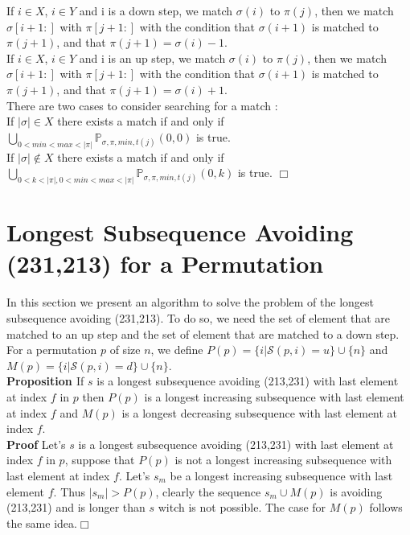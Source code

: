 \documentclass[a4paper]{llncs}
\newcommand{\ptext}{\pi}
\newcommand{\pmotif}{\sigma}
\newcommand{\x}{X}
\newcommand{\y}{Y}
\newcounter{num}
\newcommand{\numl}[1]{\refstepcounter{num}\label{#1}}
\newcommand{\dstep}{d}
\newcommand{\ustep}{u}
\begin{document}
			If $i \in \x$, $i \in \y$ and i is a down step,
			we match $\pmotif(i)$ to $\ptext(j)$, 
			then we match $\pmotif[i+1:]$ with $\ptext[j+1:]$
			with the condition that
			$\pmotif(i+1)$ is matched to $\ptext(j+1)$,
			and that $\ptext(j+1)=\pmotif(i)-1$.\\			

			If $i \in \x$, $i \in \y$ and i is an up step,
			we match $\pmotif(i)$ to $\ptext(j)$, 
			then we match $\pmotif[i+1:]$ with $\ptext[j+1:]$
			with the condition that
			$\pmotif(i+1)$ is matched to $\ptext(j+1)$,
			and that $\ptext(j+1)=\pmotif(i)+1$.\\		
					
			There are two cases to consider searching for a match : \\
			If $|\pmotif| \in \x$ there exists a match
			if and only if\\ $\bigcup_{0<min<max<|\ptext|}\mathbb{P}_{\pmotif,\ptext,min,t(j)}(0,0)$ is true.\\
			
			If $|\pmotif| \notin \x$ there exists a match if and only if \\	$\bigcup_{0<k<|\ptext|,0<min<max<|\ptext|}\mathbb{P}_{\pmotif,\ptext,min,t(j)}(0,k)$
			is true. $\Box$  			
	
	\section{Longest Subsequence Avoiding \\(231,213) for a Permutation}

	In this section we present an algorithm to solve the problem
	of the longest subsequence avoiding (231,213).
	To do so, we need the set of element
	that are matched to an up step and the
	set of element that are matched to a down step.
	For a permutation $p$ of size $n$, we define
	$P(p) = \{i | \mathcal{S}(p,i) = \ustep \} \cup \{n\}$ and  
	$M(p) = \{i | \mathcal{S}(p,i) = \dstep \} \cup \{n\}$.\\
	
	\textbf{Proposition  \numl{longestIncreasingSubsequence} \thenum}
	If $s$ is a longest subsequence avoiding (213,231) with last element at index $f$ in $p$ then
	$P(p)$ is a longest increasing subsequence with last element at index $f$ and
	$M(p)$ is a longest decreasing subsequence with last element at index $f$.\\

	
	\textbf{Proof} Let's $s$ is a longest subsequence avoiding (213,231) with last element at index $f$ in $p$, 
	suppose that $P(p)$ is not a longest increasing subsequence with last element at index $f$. Let's $s_m$ be a longest increasing subsequence with last element $f$.
	Thus $|s_m|>P(p)$, clearly the sequence $s_m \cup M(p)$
	is avoiding (213,231) and is longer than $s$ witch is not possible. 
	The case for $M(p)$ follows the same idea.$\Box$\\
\end{document}
